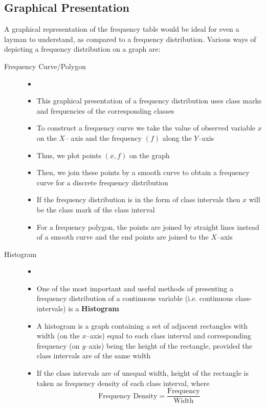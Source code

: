 \documentclass[
10pt, %
a4paper, %
]{report}
\begin{document}
\subsection*{Graphical Presentation}
A graphical representation of the frequency
table would be ideal for even a layman to
understand, as compared to a frequency distribution. Various ways of
depicting a frequency distribution on a graph are:
\begin{description}
\item[Frequency Curve/Polygon]
\begin{itemize}
\item []
\item  This graphical presentation of a frequency
distribution uses class marks and frequencies of
the corresponding classes
\item To construct a frequency curve we take the value of observed variable \(x\) on the \(X\)– axis and the frequency \((f)\) along the \(Y\)–axis
\item Thus, we plot points \((x, f)\) on the graph
\item Then, we join these points by a smooth curve to obtain a frequency curve for a discrete
frequency distribution
\item If the frequency distribution is in the form of class intervals then \(x\) will be the class mark of the class interval
\item For a frequency polygon, the points are joined by straight lines instead of a smooth curve and the end points are joined to the \(X\)–axis
\end{itemize}
\item[Histogram]
\begin{itemize}
\item[]
\item One of the most important and useful methods of presenting a frequency distribution of a continuous variable (i.e. continuous class-
intervals) is a \textbf{Histogram}
\item A histogram is a graph containing a set of
adjacent rectangles with width (on the \(x\)–axis) equal to each class interval and corresponding frequency (on \(y\)–axis) being the height of the rectangle, provided the class intervals are of the same width
\item If the class intervals are of unequal width, height of the rectangle is taken as frequency density of each class interval, where
\[
\text{Frequency Density} = \dfrac{\text{Frequency}}{\text{Width}}
\]
\end{itemize}

\end{description}
\end{document}
